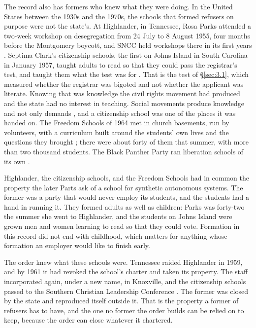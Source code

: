 The record also has formers who knew what they were doing. In the United States between the 1930s and the 1970s, the schools that formed refusers on purpose were not the state's. At Highlander, in Tennessee, Rosa Parks attended a two-week workshop on desegregation from 24 July to 8 August 1955, four months before the Montgomery boycott, and SNCC held workshops there in its first years \autocite{horton1990long}. Septima Clark's citizenship schools, the first on Johns Island in South Carolina in January 1957, taught adults to read so that they could pass the registrar's test, and taught them what the test was for \autocite{clark1986ready}. That is the test of \S\ref{sec:3.1}, which measured whether the registrar was bigoted and not whether the applicant was literate. Knowing that was knowledge the civil rights movement had produced and the state had no interest in teaching. Social movements produce knowledge and not only demands \autocite{kelley2002freedom}, and a citizenship school was one of the places it was handed on. The Freedom Schools of 1964 met in church basements, run by volunteers, with a curriculum built around the students' own lives and the questions they brought \autocite{payne1995light}; there were about forty of them that summer, with more than two thousand students. The Black Panther Party ran liberation schools of its own \autocite{perlstein2002minds}.

Highlander, the citizenship schools, and the Freedom Schools had in common the property the later Parts ask of a school for synthetic autonomous systems. The former was a party that would never employ its students, and the students had a hand in running it. They formed adults as well as children: Parks was forty-two the summer she went to Highlander, and the students on Johns Island were grown men and women learning to read so that they could vote. Formation in this record did not end with childhood, which matters for anything whose formation an employer would like to finish early.

The order knew what these schools were. Tennessee raided Highlander in 1959, and by 1961 it had revoked the school's charter and taken its property. The staff incorporated again, under a new name, in Knoxville, and the citizenship schools passed to the Southern Christian Leadership Conference \autocite{horton1990long,clark1986ready}. The former was closed by the state and reproduced itself outside it. That is the property a former of refusers has to have, and the one no former the order builds can be relied on to keep, because the order can close whatever it chartered.

